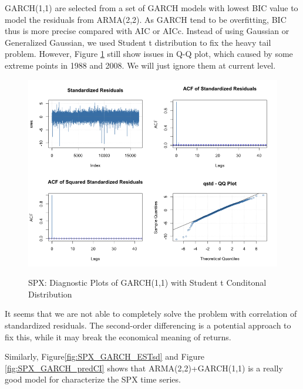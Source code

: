 \documentclass[12pt]{article}
\begin{document}
GARCH(1,1) are selected from a set of GARCH models with lowest BIC value to model the residuals from ARMA(2,2). As GARCH tend to be overfitting, BIC thus is more precise compared with AIC or AICc. Instead of using Gaussian or Generalized Gaussian, we used Student t distribution to fix the heavy tail problem. However, Figure \ref{fig:SPX_GARCH_dig}  still show issues in Q-Q plot, which caused by some extreme points in 1988 and 2008. We will just ignore them at current level. 

\begin{figure}
  \caption{SPX:  Diagnostic Plots of GARCH(1,1) with Student t Conditonal Distribution}
  \includegraphics[width = \textwidth]{../results/SPX_GARCH_dig}
  \label{fig:SPX_GARCH_dig}
\end{figure}

It seems that we are not able to completely solve the problem with correlation of standardized residuals. The second-order differencing is a potential approach to fix this, while it may break the economical meaning of returns. 

Similarly, Figure\ref{fig:SPX_GARCH_ESTsd} and Figure \ref{fig:SPX_GARCH_predCI} shows that ARMA(2,2)+GARCH(1,1) is a really good model for characterize the SPX time series.
\end{document}
